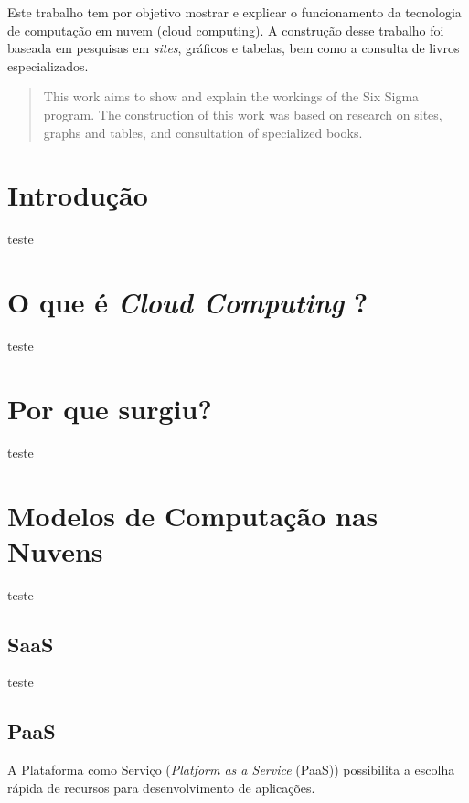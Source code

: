 \documentclass{abnt}
\begin{document}
	\capa
	
	\folhaderosto
	
	\begin{resumo}
		Este trabalho tem por objetivo mostrar e explicar o funcionamento da tecnologia de computação em nuvem (cloud computing). 
		A construção desse trabalho foi baseada em pesquisas em \textit{sites}, gráficos e tabelas, bem como a consulta de livros especializados.
	\end{resumo}

	\begin{abstract}
		This work aims to show and explain the workings of the Six Sigma program. The construction of this work was based on research on sites, graphs and tables, and consultation of specialized books.
	\end{abstract}
	
	\sumario
	
	\listadetabelas
	
	\listadefiguras
	
	\newpage
	
	\section{Introdução}
		teste
	\section{O que é \textit{Cloud Computing} ?}
		teste
	\section{Por que surgiu?}
		teste
	\section{Modelos de Computação nas Nuvens}
		teste
	\subsection{SaaS}
		teste
	\subsection{PaaS}
		A Plataforma como Serviço (\textit{Platform as a Service} (PaaS)) possibilita a escolha rápida de recursos para desenvolvimento de aplicações.
		
\end{document}
